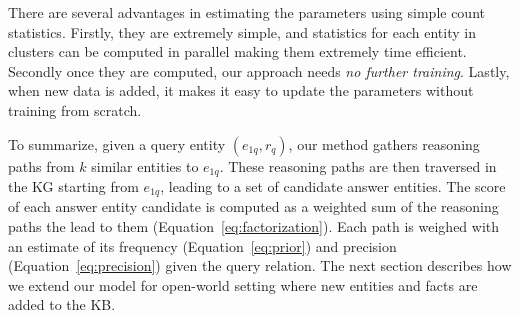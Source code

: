 \documentclass[11pt,a4paper]{article}
\begin{document}
There are several advantages in estimating the parameters using simple count statistics. Firstly, they are extremely simple, and statistics for each entity in clusters can be computed in parallel making them extremely time efficient. Secondly once they are computed, our approach needs \emph{no further training}. Lastly, when new data is added, it makes it easy to update the parameters without training from scratch. 

To summarize, given a query entity $(e_{1q}, r_q)$, our method gathers reasoning paths from $k$ similar entities to $e_{1q}$. These reasoning paths are then traversed in the KG starting from $e_{1q}$, leading to a set of candidate answer entities. The score of each answer entity candidate is computed as a weighted sum of the reasoning paths the lead to them (Equation~\ref{eq:factorization}). Each path is weighed with an estimate of its frequency (Equation~\ref{eq:prior}) and precision (Equation~\ref{eq:precision}) given the query relation. The next section describes how we extend our model for open-world setting where new entities and facts are added to the KB.
\end{document}
